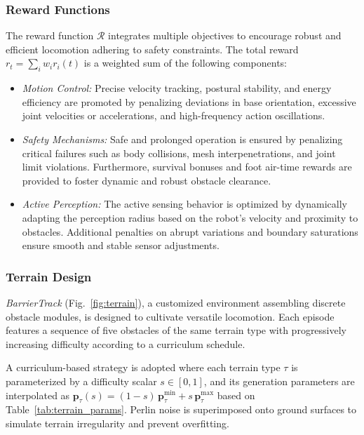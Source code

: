 \subsubsection{Reward Functions}
The reward function $\mathcal{R}$ integrates multiple objectives to encourage robust and efficient locomotion adhering to safety constraints. The total reward $r_t = \sum_i w_i r_i(t)$ is a weighted sum of the following components:

\begin{itemize}
    \item \textit{Motion Control:} Precise velocity tracking, postural stability, and energy efficiency are promoted by penalizing deviations in base orientation, excessive joint velocities or accelerations, and high-frequency action oscillations.
    
    \item \textit{Safety Mechanisms:} Safe and prolonged operation is ensured by penalizing critical failures such as body collisions, mesh interpenetrations, and joint limit violations. Furthermore, survival bonuses and foot air-time rewards are provided to foster dynamic and robust obstacle clearance.
    
    \item \textit{Active Perception:} The active sensing behavior is optimized by dynamically adapting the perception radius based on the robot's velocity and proximity to obstacles. Additional penalties on abrupt variations and boundary saturations ensure smooth and stable sensor adjustments.
\end{itemize}

\subsubsection{Terrain Design}
\textit{BarrierTrack} (Fig.~\ref{fig:terrain}), a customized environment assembling discrete obstacle modules, is designed to cultivate versatile locomotion. Each episode features a sequence of five obstacles of the same terrain type with progressively increasing difficulty according to a curriculum schedule. 

A curriculum-based strategy is adopted where each terrain type $\tau$ is parameterized by a difficulty scalar $s \in [0, 1]$, and its generation parameters are interpolated as $\mathbf{p}_\tau(s) = (1-s)\,\mathbf{p}_\tau^{\min} + s\,\mathbf{p}_\tau^{\max}$ based on Table~\ref{tab:terrain_params}. Perlin noise is superimposed onto ground surfaces to simulate terrain irregularity and prevent overfitting.


